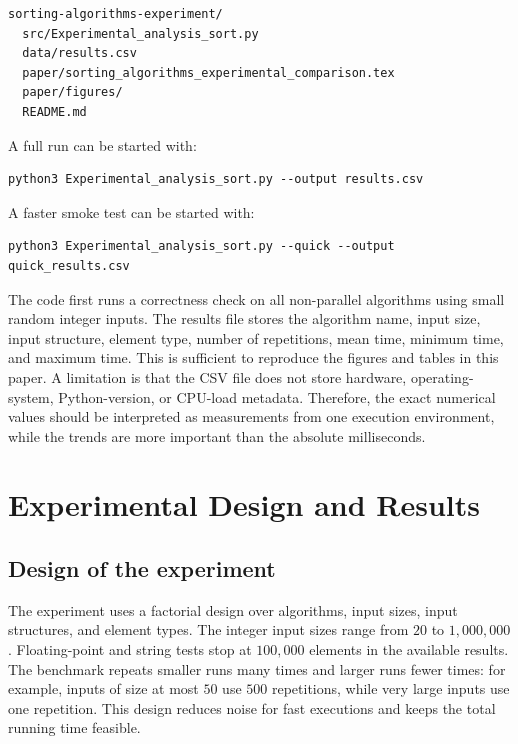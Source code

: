 \documentclass[11pt,a4paper]{article}
\begin{document}
\begin{verbatim}
sorting-algorithms-experiment/
  src/Experimental_analysis_sort.py
  data/results.csv
  paper/sorting_algorithms_experimental_comparison.tex
  paper/figures/
  README.md
\end{verbatim}

A full run can be started with:

\begin{verbatim}
python3 Experimental_analysis_sort.py --output results.csv
\end{verbatim}

A faster smoke test can be started with:

\begin{verbatim}
python3 Experimental_analysis_sort.py --quick --output quick_results.csv
\end{verbatim}

The code first runs a correctness check on all non-parallel algorithms using small random integer inputs. The results file stores the algorithm name, input size, input structure, element type, number of repetitions, mean time, minimum time, and maximum time. This is sufficient to reproduce the figures and tables in this paper. A limitation is that the CSV file does not store hardware, operating-system, Python-version, or CPU-load metadata. Therefore, the exact numerical values should be interpreted as measurements from one execution environment, while the trends are more important than the absolute milliseconds.

\section{Experimental Design and Results}\label{sec:experiment}

\subsection{Design of the experiment}

The experiment uses a factorial design over algorithms, input sizes, input structures, and element types. The integer input sizes range from $20$ to $1,000,000$. Floating-point and string tests stop at $100,000$ elements in the available results. The benchmark repeats smaller runs many times and larger runs fewer times: for example, inputs of size at most $50$ use $500$ repetitions, while very large inputs use one repetition. This design reduces noise for fast executions and keeps the total running time feasible.
\end{document}
